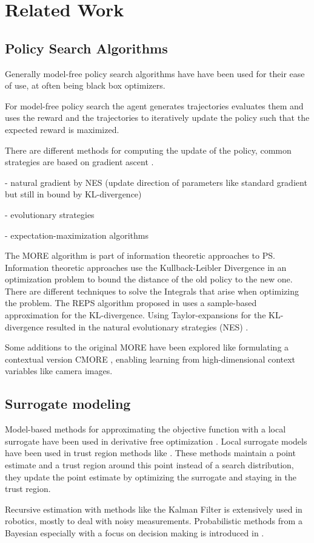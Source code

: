 
\chapter{Related Work}

\section{Policy Search Algorithms}
Generally model-free policy search algorithms have have been used
for their ease of use, at often being black box optimizers.

For model-free policy search the agent generates trajectories
evaluates them and uses the reward and the trajectories to
iteratively update the policy such that the expected reward is maximized.

There are different methods for computing the update of the
policy, common strategies are based on gradient ascent
\citet{peters2006policy}.

- natural gradient by NES (update direction of parameters like standard
gradient but still in bound by KL-divergence)

- evolutionary strategies

- expectation-maximization algorithms

The MORE algorithm is part of information theoretic approaches
to PS.
Information theoretic approaches use
the Kullback-Leibler Divergence in an optimization problem
to bound the distance of the old policy to the new one.
There are different techniques to solve the Integrals that arise
when optimizing the problem.
The REPS algorithm proposed in \cite{peters2010relative} uses a
sample-based approximation for the KL-divergence.
Using Taylor-expansions for the KL-divergence resulted in the natural
evolutionary strategies (NES) \cite{wierstra2014natural}.

Some additions to the original MORE have been explored like formulating
a contextual version CMORE \citet{tangkaratt2017policy}, enabling learning from high-dimensional
context variables like camera images.

\section{Surrogate modeling}
Model-based methods for approximating the objective function
with a local surrogate have been used in
derivative free optimization \citet{nocedal2006numerical}.
Local surrogate models have been used in trust region methods like \citet{powell2009bobyqa}. These methods maintain a point estimate
and a trust region around this point instead
of a search distribution, they update the point estimate by optimizing
the surrogate and staying in the trust region.

Recursive estimation with methods like
the Kalman Filter is extensively used in robotics, mostly to deal with
noisy measurements. Probabilistic methods from
a Bayesian especially with a focus on decision making
is introduced in \citet{thrun2002probabilistic}.

